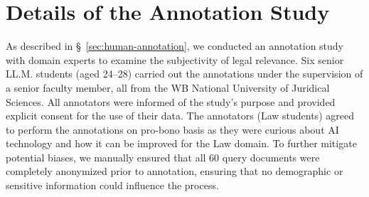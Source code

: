 \section{Details of the Annotation Study} \label{app:annot}

As described in \S~\ref{sec:human-annotation}, we conducted an annotation study with domain experts to examine the subjectivity of legal relevance. Six senior LL.M. students (aged 24–28) carried out the annotations under the supervision of a senior faculty member, all from the WB National University of Juridical Sciences. All annotators were informed of the study’s purpose and provided explicit consent for the use of their data. The annotators (Law students) agreed to perform the annotations on pro-bono basis as they were curious about AI technology and how it can be improved for the Law domain. To further mitigate potential biases, we manually ensured that all 60 query documents were completely anonymized prior to annotation, ensuring that no demographic or sensitive information could influence the process.




